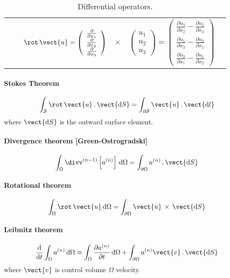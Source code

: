 \begin{table}[!htb]
\begin{tabular}{l | c | l | l @{}l@{\,} l  }
&  & $\rot \, \vect{u}  =
 \left( \begin{array}{c}
\frac{\partial }{\partial x_1}\\
\frac{\partial }{\partial x_2}\\
\frac{\partial }{\partial x_3}
\end{array} \right) 
$&$ \times $&$
\left( \begin{array}{c}
u_1\\
u_2 \\
u_3
\end{array} \right)  
 = 
\left( \begin{array}{c}
\frac{\partial u_3}{\partial x_2} - \frac{\partial u_2}{\partial x_3}\\
\frac{\partial u_1}{\partial x_3} - \frac{\partial u_3}{\partial x_1} \\
\frac{\partial u_2}{\partial x_1} -\frac{\partial u_1}{\partial x_2}
\end{array} \right)  
$
\end{tabular}
\caption{Differential operators.}
\end{table}
%
%

\paragraph{Stokes Theorem}
%
\begin{equation*}
\int_{ \mathcal{S}} \rot \, \vect{u} \, . \, \vect{ \mathrm{d}S} = \int_{\partial \mathcal{S} } \vect{u} \, . \, \vect{\mathrm{d}l }
\end{equation*}
where $ \vect{ \mathrm{d}S }$ is the outward surface element.

\paragraph{Divergence theorem [Green-Ostrogradski]}
%
\begin{equation*}
\int_{ \Omega } \divv^{(n-1)}  \left[ a^{(n)} \right] \, \mathrm{d}\Omega= \int_{\partial \Omega } a^{(n)} \, . \, \vect{ \mathrm{d}S }
\end{equation*}
\paragraph{Rotational theorem}
%
\begin{equation*}
\int_{ \Omega } \rot \, \vect{u} \, \mathrm{d}\Omega= \int_{\partial \Omega } \vect{u} \, \times \, \vect{ \mathrm{d}S }
\end{equation*}

\paragraph{Leibnitz theorem}
%
\begin{equation*}
\dfrac{ \mathrm{d} }{ \mathrm{d}t }\int_{ \Omega } a^{(n)} \, \mathrm{d}\Omega =
\int_{ \Omega } \dfrac{\partial a^{(n)} }{ \partial t} \, \mathrm{d}\Omega
+ \int_{\partial \Omega } a^{(n)} \vect{v} \, . \, \vect{ \mathrm{d}S }
\end{equation*}
where $\vect{v}$ is control volume $ \Omega$ velocity.
